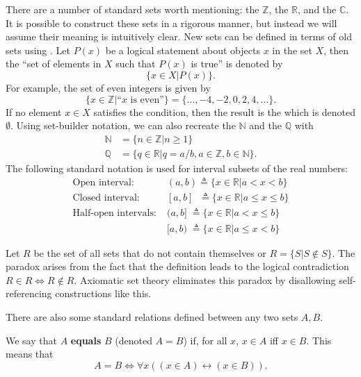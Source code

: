 There are a number of standard sets worth mentioning: the  $\mathbb{Z}$, the  $\mathbb{R}$, and the  $\mathbb{C}$.
It is possible to construct these sets in a rigorous manner, but instead we will assume their meaning is intuitively clear.
New sets can be defined in terms of old sets using .
Let $P(x)$ be a logical statement about objects $x$ in the set $X$, then the ``set of elements in $X$ such that $P(x)$ is true'' is denoted by
\[ \{ x\in X | P(x) \}. \]
For example, the set of even integers is given by
\[ \{ x\in \mathbb{Z} | \textrm{``}x\textrm{ is even''} \} = \{ \ldots,-4,-2,0,2,4,\ldots \}. \]
If no element $x\in X$ satisfies the condition, then the result is the  which is denoted $\emptyset$.
Using set-builder notation, we can also recreate the  $\mathbb{N}$ and the  $\mathbb{Q}$ with
\begin{align*}
\mathbb{N} & = \{ n\in \mathbb{Z} | n\geq 1 \} \\
\mathbb{Q} & = \{ q\in \mathbb{R} | q=a/b, a\in \mathbb{Z}, b\in \mathbb{N} \}.
\end{align*}
The following standard notation is used for interval subsets of the real numbers:
\begin{align*}
\textrm{Open interval:} \; &  (a,b) \triangleq \{ x\in \mathbb{R} | a<x<b \} \\
\textrm{Closed interval:} \; & [a,b] \;\;\!\! \triangleq \{ x\in \mathbb{R} | a \leq x \leq b \} \\
\textrm{Half-open intervals:} \; & (a,b] \;\! \triangleq \{ x\in \mathbb{R} | a < x \leq b \} \\
& [a,b) \;\! \triangleq \{ x\in \mathbb{R} | a \leq x < b \}
\end{align*}

\begin{example}
Let $R$ be the set of all sets that do not contain themselves or $R = \{S|S\notin S\}$.
The paradox arises from the fact that the definition leads to the logical contradiction $R\in R \Leftrightarrow R\notin R$.
Axiomatic set theory eliminates this paradox by disallowing self-referencing constructions like this.
\end{example}

There are also some standard relations defined between any two sets $A,B$.
\begin{definition}
We say that $A$ \textbf{equals} $B$ (denoted $A=B$) if, for all $x$,  $x\in A$ iff $x\in B$.
This means that
\[ A=B \Leftrightarrow \forall x \left( (x\in A)\leftrightarrow (x\in B) \right). \]
\end{definition}

